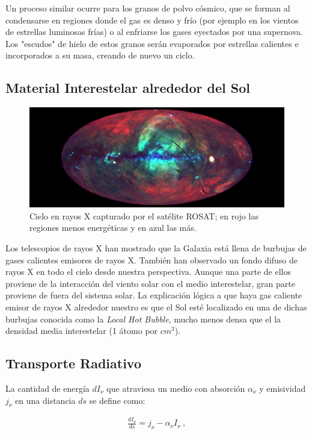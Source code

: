 \documentclass{tufte-handout}
\begin{document}
Un proceso similar ocurre para los granos de polvo cósmico, que se forman al condensarse en regiones donde el gas es denso y frío (por ejemplo en los vientos de estrellas luminosas frías) o al enfriarse los gases eyectados por una supernova. Los "escudos" de hielo de estos granos serán evaporados por estrellas calientes e incorporados a su masa, creando de nuevo un ciclo.

\subsection{Material Interestelar alrededor del Sol}

\begin{figure}
  \includegraphics[width=\linewidth]{img/xray}
  \caption{Cielo en rayos X capturado por el satélite ROSAT; en rojo las regiones menos energéticas y en azul las más.}
\end{figure}

Los telescopios de rayos X han mostrado que la Galaxia está llena de burbujas de gases calientes emisores de rayos X. También han observado un fondo difuso de rayos X en todo el cielo desde nuestra perspectiva. Aunque una parte de ellos proviene de la interacción del viento solar con el medio interestelar, gran parte proviene de fuera del sistema solar. La explicación lógica a que haya gas caliente emisor de rayos X alrededor nuestro es que el Sol esté localizado en una de dichas burbujas conocida como la \emph{Local Hot Bubble}, mucho menos densa que el la densidad media interestelar (1 átomo por $cm^3$).

\subsection{Transporte Radiativo}

La cantidad de energía $dI_\nu$ que atraviesa un medio con absorción $\alpha_\nu$ y emisividad $j_\nu$ en una distancia $ds$ se define como:

\begin{align}
\frac{dI_\nu}{ds} = j_\nu - \alpha_\nu I_\nu~,
\end{align}
\end{document}
